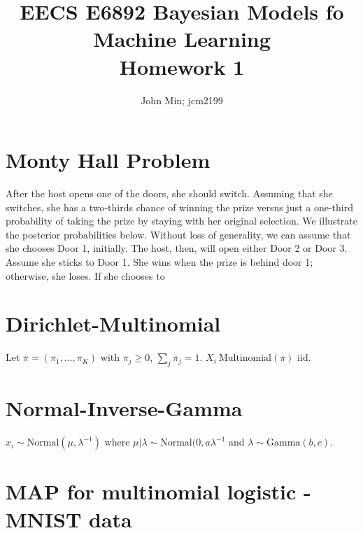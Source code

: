 \documentclass{article}
\title{EECS E6892 Bayesian Models fo Machine Learning\\ Homework 1}
\author{John Min; jcm2199}
\begin{document}
\maketitle
\section{Monty Hall Problem}

After the host opens one of the doors, she should switch.  Assuming that she switches, she has a two-thirds chance of winning the prize versus just a one-third probability of taking the prize by staying with her original selection.  We illustrate the posterior probabilities below.  Without loss of generality, we can assume that she chooses Door 1, initially.  The host, then, will open either Door 2 or Door 3.  \\
Assume she sticks to Door 1.  She wins when the prize is behind door 1; otherwise, she loses.  If she chooses to 

\section{Dirichlet-Multinomial}

Let $\pi = (\pi_1, ..., \pi_K)$ with $\pi_j \geq 0$, $\sum_j \pi_j = 1$.  $X_i ~ \text{Multinomial} (\pi)$ iid.

\section{Normal-Inverse-Gamma}
$x_i \sim \text{Normal}(\mu, \lambda^{-1})$ where $\mu | \lambda \sim \text{Normal}(0, a \lambda^{-1}$ and $\lambda \sim \text{Gamma}(b,c)$.  


\section{MAP for multinomial logistic - MNIST data}
\end{document}
